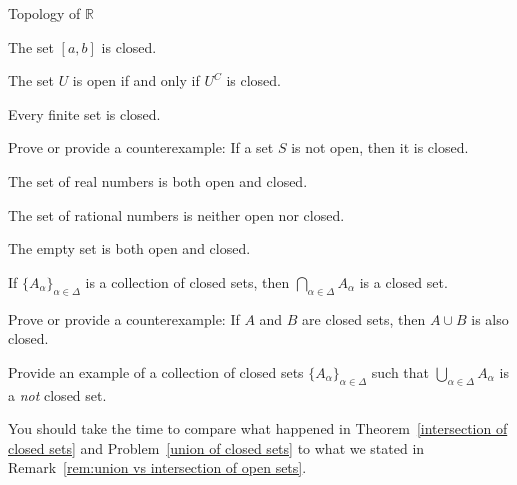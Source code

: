\begin{section}{Topology of $\mathbb{R}$}
\begin{problem}
\end{problem}

\begin{theorem}
The set $[a,b]$ is closed.
\end{theorem}

\begin{theorem}
The set $U$ is open if and only if $U^C$ is closed.
\end{theorem}

\begin{theorem}
Every finite set is closed.
\end{theorem}

\begin{problem}
Prove or provide a counterexample: If a set $S$ is not open, then it is closed.
\end{problem}

\begin{theorem}
The set of real numbers is both open and closed.
\end{theorem}

\begin{theorem}
The set of rational numbers is neither open nor closed.
\end{theorem}

\begin{theorem}
The empty set is both open and closed.
\end{theorem}

\begin{theorem}\label{intersection of closed sets}
If $\{A_{\alpha}\}_{\alpha\in\Delta}$ is a collection of closed sets, then $\bigcap_{\alpha\in \Delta} A_{\alpha}$ is a closed set.
\end{theorem}

\begin{problem}
Prove or provide a counterexample: If $A$ and $B$ are closed sets, then $A\cup B$ is also closed.
\end{problem}

\begin{problem}\label{union of closed sets}
Provide an example of a collection of closed sets $\{A_{\alpha}\}_{\alpha\in\Delta}$ such that $\bigcup_{\alpha\in \Delta} A_{\alpha}$ is a \emph{not} closed set.
\end{problem}

You should take the time to compare what happened in Theorem~\ref{intersection of closed sets} and Problem~\ref{union of closed sets} to what we stated in Remark~\ref{rem:union vs intersection of open sets}.

\end{section}